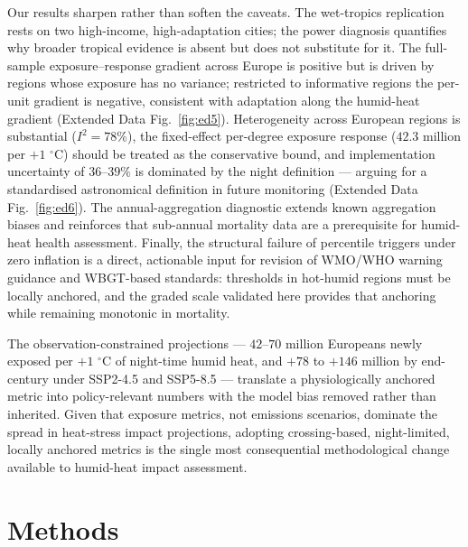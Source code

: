\documentclass[12pt,a4paper]{article}
\newcommand{\dd}{\ensuremath{\,^{\circ}\mathrm{C}}}
\begin{document}
Our results sharpen rather than soften the caveats. The wet-tropics replication rests on two
high-income, high-adaptation cities; the power diagnosis quantifies why broader tropical evidence is
absent but does not substitute for it. The full-sample exposure--response gradient across Europe is
positive but is driven by regions whose exposure has no variance; restricted to informative regions
the per-unit gradient is negative, consistent with adaptation along the humid-heat gradient
(Extended Data Fig.~\ref{fig:ed5}). Heterogeneity across European regions is substantial
($I^2=78\%$), the fixed-effect per-degree exposure response ($42.3$ million per $+1\,\dd$) should be
treated as the conservative bound, and implementation uncertainty of $36$--$39\%$ is dominated by
the night definition --- arguing for a standardised astronomical definition in future monitoring
(Extended Data Fig.~\ref{fig:ed6}). The annual-aggregation diagnostic extends known aggregation
biases\citep{Ballester2024} and reinforces that sub-annual mortality data are a prerequisite for
humid-heat health assessment. Finally, the structural failure of percentile triggers under zero
inflation is a direct, actionable input for revision of WMO/WHO warning guidance\citep{WMOWHO2015}
and WBGT-based standards\citep{ISO7243,Brimicombe2023}: thresholds in hot-humid regions must be
locally anchored, and the graded scale validated here provides that anchoring while remaining
monotonic in mortality.

The observation-constrained projections --- $42$--$70$ million Europeans newly exposed per
$+1\,\dd$ of night-time humid heat, and $+78$ to $+146$ million by end-century under SSP2-4.5 and
SSP5-8.5 --- translate a physiologically anchored metric into policy-relevant numbers with the model
bias removed rather than inherited\citep{IPCCAR6Ch11,Coffel2018}. Given that exposure metrics, not
emissions scenarios, dominate the spread in heat-stress impact projections\citep{Schwingshackl2021},
adopting crossing-based, night-limited, locally anchored metrics is the single most consequential
methodological change available to humid-heat impact assessment.

\section*{Methods}
\end{document}
